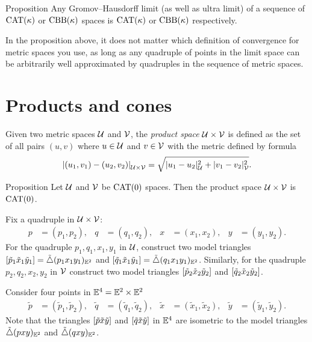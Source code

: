 \begin{thm}{Proposition}\label{prop:cat-limit}
Any Gromov--Hausdorff limit (as well as ultra limit) of a sequence of $\mathrm{CAT}(\kappa)$ or $\mathrm{CBB}(\kappa)$ spaces is $\mathrm{CAT}(\kappa)$ or $\mathrm{CBB}(\kappa)$ respectively. 
\end{thm}

In the proposition above, 
it does not matter which definition of convergence for metric spaces you use, 
as long as any quadruple of points in the limit space can be arbitrarily well approximated by  quadruples in the sequence of metric spaces. 

\section{Products and cones}

Given two metric spaces $\mathcal{U}$ and $\mathcal{V}$, the \emph{product space} 
$\mathcal{U}\times\mathcal{V}$ is defined as the set of all pairs $(u,v)$ where $u\in\mathcal{U}$ and $v\in \mathcal{V}$ 
with the metric defined by formula
\[\dist{(u_1,v_1)}{(u_2,v_2)}{\spc{U}\times\spc{V}}=\sqrt{\dist[2]{u_1}{u_2}{\spc{U}}+\dist[2]{v_1}{v_2}{\spc{V}}}.\]

\begin{thm}{Proposition}\label{ex:product-CAT}
Let $\mathcal{U}$ and $\mathcal{V}$ be $\mathrm{CAT}(0)$ spaces.
Then the product space $\mathcal{U}\times\mathcal{V}$ is $\mathrm{CAT}(0)$.
\end{thm}

Fix a quadruple in $\mathcal{U}\times \mathcal{V}$:
\begin{align*}
p&=(p_1,p_2),
&
q&=(q_1,q_2), 
&
x&=(x_1,x_2),
&
y&=(y_1,y_2).
\end{align*}
For the quadruple $p_1,q_1,x_1,y_1$ in $\mathcal{U}$,
construct two model triangles $[\tilde p_1\tilde x_1\tilde y_1]=\tilde\triangle(p_1x_1y_1)_{\mathbb{E}^2}$ 
and $[\tilde q_1\tilde x_1\tilde y_1]=\tilde\triangle(q_1x_1y_1)_{\mathbb{E}^2}$.  
Similarly, for the quadruple $p_2,q_2,x_2,y_2$ in $\mathcal{V}$
construct two model triangles $[\tilde p_2\tilde x_2\tilde y_2]$ and $[\tilde q_2\tilde x_2\tilde y_2]$.

Consider four points in $\mathbb{E}^4=\mathbb{E}^2\times\mathbb{E}^2$ 
\begin{align*}
\tilde p&=(\tilde p_1,\tilde p_2),
&
\tilde q&=(\tilde q_1,\tilde q_2),
&
\tilde x&=(\tilde x_1,\tilde x_2),
&
\tilde y&=(\tilde y_1,\tilde y_2).
\end{align*}
Note that the triangles $[\tilde p\tilde x\tilde y]$ and $[\tilde q\tilde x\tilde y]$ in $\mathbb{E}^4$ are isometric to the model triangles 
$\tilde\triangle(pxy)_{\mathbb{E}^2}$ and $\tilde\triangle(qxy)_{\mathbb{E}^2}$.

